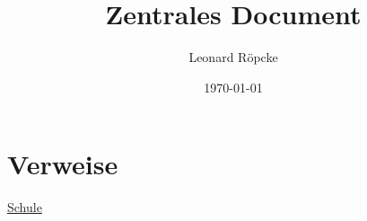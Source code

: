 \documentclass[12pt,a4paper]{article}
\title{Zentrales Document}
\author{Leonard Röpcke}
\date{\today}
\begin{document}
\maketitle

\section{Verweise}
\href{https://github.com/leonard-roepcke/Knoledge-Archive/blob/main/main_docs/school/school.pdf}{Schule}
\end{document}
